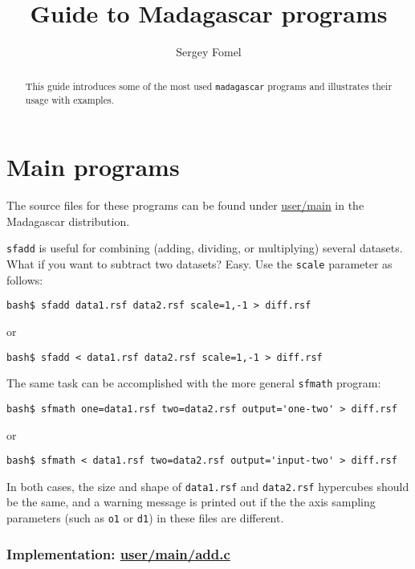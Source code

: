 \title{Guide to Madagascar programs}
\author{Sergey Fomel}

\maketitle

\begin{abstract}

This guide introduces some of the most used \texttt{madagascar} programs and illustrates their
usage with examples.

\end{abstract}

\section{Main programs}

The source files for these programs can be found under
\href{http://rsf.svn.sourceforge.net/viewvc/rsf/trunk/user/main/}{user/main}
in the Madagascar distribution.

\noindent\doublebox{\parbox{\textwidth}{

}}

\texttt{sfadd} is useful for combining (adding, dividing, or
multiplying) several datasets. What if you want to subtract two
datasets? Easy. Use the \texttt{scale} parameter as follows:
\begin{verbatim}
bash$ sfadd data1.rsf data2.rsf scale=1,-1 > diff.rsf
\end{verbatim}
or
\begin{verbatim}
bash$ sfadd < data1.rsf data2.rsf scale=1,-1 > diff.rsf
\end{verbatim}
The same task can be accomplished with the more general \texttt{sfmath} program:
\begin{verbatim}
bash$ sfmath one=data1.rsf two=data2.rsf output='one-two' > diff.rsf
\end{verbatim}
or
\begin{verbatim}
bash$ sfmath < data1.rsf two=data2.rsf output='input-two' > diff.rsf
\end{verbatim}
In both cases, the size and shape of \texttt{data1.rsf} and
\texttt{data2.rsf} hypercubes should be the same, and a warning
message is printed out if the the axis sampling parameters (such as
\texttt{o1} or \texttt{d1}) in these files are different.

\subsubsection{Implementation: \href{http://rsf.svn.sourceforge.net/viewvc/rsf/trunk/user/main/add.c?view=markup}{user/main/add.c}}

